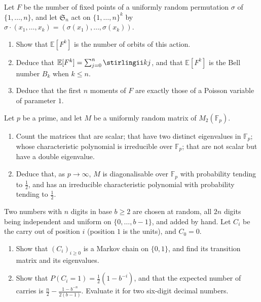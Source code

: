 \begin{exercise}[$\star\star$]\label{pb:fixmoments}
Let $F$ be the number of fixed points of a uniformly random permutation $\sigma$ of $\{1,\dots,n\}$, and let $\mathfrak S_n$
act on $\{1,\dots,n\}^k$ by $\sigma\cdot(x_1,\dots,x_k)=(\sigma(x_1),\dots,\sigma(x_k))$.
\begin{enumerate}[label=(\alph*)]
\item Show that $\mathbb E[F^k]$ is the number of orbits of this action.
\item Deduce that $\mathbb E[F^k]=\sum_{j=0}^n\stirlingii kj$, and that $\mathbb E[F^k]$ is the Bell number $B_k$ when $k\le n$.
\item Deduce that the first $n$ moments of $F$ are exactly those of a Poisson variable of parameter $1$.
\end{enumerate}
\end{exercise}

\begin{exercise}[$\star\star$]\label{pb:matrices2}
Let $p$ be a prime, and let $M$ be a uniformly random matrix of $M_2(\mathbb F_p)$.
\begin{enumerate}[label=(\alph*)]
\item Count the matrices that are scalar; that have two distinct eigenvalues in $\mathbb F_p$; whose characteristic polynomial
is irreducible over $\mathbb F_p$; that are not scalar but have a double eigenvalue.
\item Deduce that, as $p\to\infty$, $M$ is diagonalisable over $\mathbb F_p$ with probability tending to $\frac12$, and has an
irreducible characteristic polynomial with probability tending to $\frac12$.
\end{enumerate}
\end{exercise}

\begin{exercise}[$\star\star$]\label{pb:carries}
Two numbers with $n$ digits in base $b\ge2$ are chosen at random, all $2n$ digits being independent and uniform on
$\{0,\dots,b-1\}$, and added by hand. Let $C_i$ be the carry out of position $i$ (position $1$ is the units), and $C_0=0$.
\begin{enumerate}[label=(\alph*)]
\item Show that $(C_i)_{i\ge0}$ is a Markov chain on $\{0,1\}$, and find its transition matrix and its eigenvalues.
\item Show that $P(C_i=1)=\frac12(1-b^{-i})$, and that the expected number of carries is
$\frac n2-\frac{1-b^{-n}}{2(b-1)}$. Evaluate it for two six-digit decimal numbers.
\end{enumerate}
\end{exercise}

